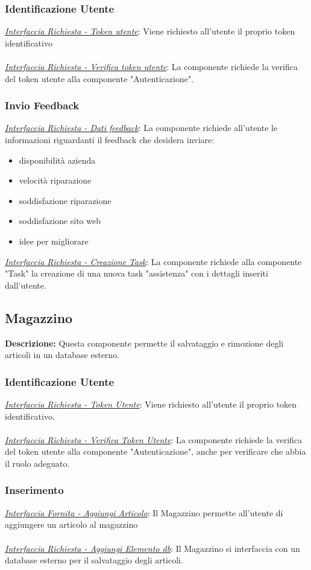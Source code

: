 \documentclass{report}
\begin{document}
\subsubsection*{\indent \indent Identificazione Utente}
\textcolor{Auth}{\uline{\textit{Interfaccia Richiesta - Token utente}}}: 
Viene richiesto all'utente il proprio token identificativo\\ \\
\textcolor{Auth}{\uline{\textit{Interfaccia Richiesta - Verifica token utente}}}:
La componente richiede la verifica del token utente alla componente "Autenticazione".
\subsubsection*{\indent \indent Invio Feedback}
\uline{\textit{Interfaccia Richiesta - Dati feedback}}:
La componente richiede all'utente le informazioni riguardanti il feedback che desidera inviare:
\begin{itemize}
	\item disponibilità azienda
	\item velocità riparazione
	\item soddisfazione riparazione
	\item soddisfazione sito web
	\item idee per migliorare
\end{itemize}
\uline{\textit{Interfaccia Richiesta - Creazione Task}}:
La componente richiede alla componente "Task" la creazione di una nuova task "assistenza" con i dettagli inseriti dall'utente.

\subsection*{Magazzino}
\textbf{Descrizione: } Questa componente permette il salvataggio e rimozione degli articoli in un database esterno.
\subsubsection*{ \indent \indent Identificazione Utente}
\textcolor{Auth}{\uline{\textit{Interfaccia Richiesta - Token Utente}}}:
Viene richiesto all'utente il proprio token identificativo.\\ \\
\textcolor{Auth}{\uline{\textit{Interfaccia Richiesta - Verifica Token Utente}}}: 
La componente richiede la verifica del token utente alla componente "Autenticazione", anche per verificare che abbia il ruolo adeguato.
\subsubsection*{\indent \indent Inserimento}
\uline{\textit{Interfaccia Fornita - Aggiungi Articolo}}:
Il Magazzino permette all'utente di aggiungere un articolo al magazzino  \\ \\%
\textcolor{Database}{\uline{\textit{Interfaccia Richiesta - Aggiungi Elemento db}}}:
Il Magazzino si interfaccia con un database esterno per il salvataggio degli articoli.
\end{document}
